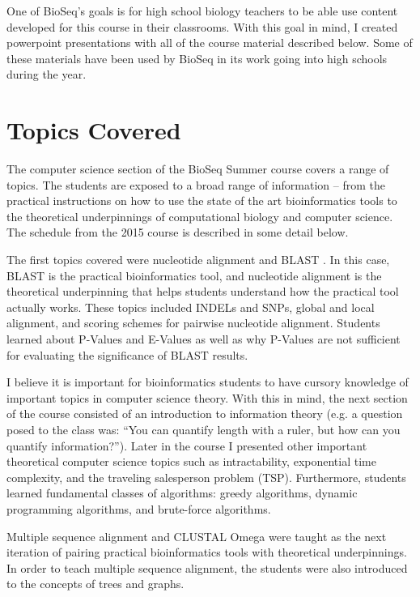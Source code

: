 \documentclass{report}
\begin{document}
One of BioSeq's goals is for high school biology teachers to be able use content developed for this course in their classrooms. With this goal in mind, I created powerpoint presentations with all of the course material described below. Some of these materials have been used by BioSeq in its work going into high schools during the year. 

\section{Topics Covered}
The computer science section of the BioSeq Summer course covers a range of topics. The students are exposed to a broad range of information -- from the practical instructions on how to use the state of the art bioinformatics tools to the theoretical underpinnings of computational biology and computer science. The schedule from the 2015 course is described in some detail below. 

The first topics covered were nucleotide alignment and BLAST  \cite{altschul1990basic}. In this case, BLAST is the practical bioinformatics tool, and nucleotide alignment is the theoretical underpinning that helps students understand how the practical tool actually works. These topics included INDELs and SNPs, global and local alignment, and scoring schemes for pairwise nucleotide alignment. Students learned about P-Values and E-Values as well as why P-Values are not sufficient for evaluating the significance of BLAST results. 

I believe it is important for bioinformatics students to have cursory knowledge of important topics in computer science theory. With this in mind, the next section of the course consisted of an introduction to information theory (e.g. a question posed to the class was: ``You can quantify length with a ruler, but how can you quantify information?''). Later in the course I presented other important theoretical computer science topics such as intractability, exponential time complexity, and the traveling salesperson problem (TSP). Furthermore, students learned fundamental classes of algorithms: greedy algorithms, dynamic programming algorithms, and brute-force algorithms. 

Multiple sequence alignment and CLUSTAL Omega \cite{sievers2011fast} were taught as the next iteration of pairing practical bioinformatics tools with theoretical underpinnings. In order to teach multiple sequence alignment, the students were also introduced to the concepts of trees and graphs.
\end{document}
